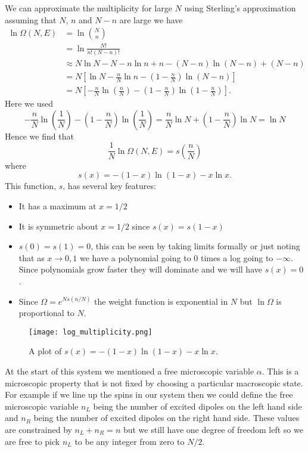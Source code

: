 \documentclass[a4paper]{article}
\begin{document}
    We can approximate the multiplicity for large \(N\) using Sterling's approximation assuming that \(N\), \(n\) and \(N - n\) are large we have
    \begin{align*}
        \ln\Omega(N, E) &= \ln{N \choose n}\\
        &= \ln\frac{N!}{n!(N - n)!}\\
        &\approx N\ln N - N - n\ln n + n - (N - n)\ln(N - n) + (N - n)\\
        &= N\left[\ln N - \frac{n}{N}\ln n - \left(1 - \frac{n}{N}\right)\ln(N - n)\right]\\
        &= N\left[-\frac{n}{N}\ln\left(\frac{n}{N}\right) - \left(1 - \frac{n}{N}\right)\ln\left(1 - \frac{n}{N}\right)\right].
    \end{align*}
    Here we used
    \[-\frac{n}{N}\ln\left(\frac{1}{N}\right) - \left(1 - \frac{n}{N}\right)\ln\left(\frac{1}{N}\right) = \frac{n}{N}\ln N + \left(1 - \frac{n}{N}\right)\ln N = \ln N\]
    Hence we find that
    \[\frac{1}{N}\ln\Omega(N, E) = s\left(\frac{n}{N}\right)\]
    where
    \[s(x) = -(1 - x)\ln(1 - x) - x\ln x.\]
    This function, \(s\), has several key features:
    \begin{itemize}
        \item It has a maximum at \(x = 1/2\)
        \item It is symmetric about \(x = 1/2\) since \(s(x) = s(1 - x)\)
        \item \(s(0) = s(1) = 0\), this can be seen by taking limits formally or just noting that as \(x\to 0, 1\) we have a polynomial going to \(0\) times a log going to \(-\infty\).
        Since polynomials grow faster they will dominate and we will have \(s(x) = 0\).
        \item Since \(\Omega = e^{Ns(n/N)}\) the weight function is exponential in \(N\) but \(\ln \Omega\) is proportional to \(N\).
    \end{itemize}
    \begin{figure}[ht]
        \centering
        \texttt{[image: log\_multiplicity.png]}
        \caption{A plot of \(s(x) = -(1 - x)\ln(1 - x) - x\ln x\).}
    \end{figure}
    At the start of this system we mentioned a free microscopic variable \(\alpha\).
    This is a microscopic property that is not fixed by choosing a particular macroscopic state.
    For example if we line up the spins in our system then we could define the free microscopic variable \(n_L\) being the number of excited dipoles on the left hand side and \(n_R\) being the number of excited dipoles on the right hand side.
    These values are constrained by \(n_L + n_R = n\) but we still have one degree of freedom left so we are free to pick \(n_L\) to be any integer from zero to \(N/2\).
    
\end{document}
